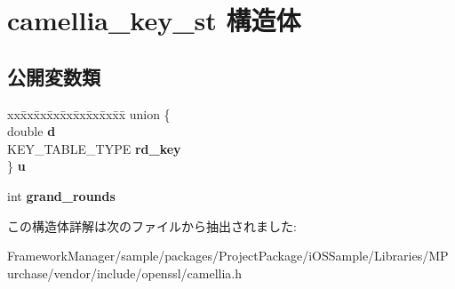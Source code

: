 \hypertarget{structcamellia__key__st}{}\section{camellia\+\_\+key\+\_\+st 構造体}
\label{structcamellia__key__st}
\subsection*{公開変数類}
\begin{DoxyCompactItemize}
\item 
\hypertarget{structcamellia__key__st_ad83acb1005aa0ea9c6f51ee7fbcdc4d9}{}\begin{tabbing}
xx\=xx\=xx\=xx\=xx\=xx\=xx\=xx\=xx\=\kill
union \{\\
\>double {\bfseries d}\\
\>KEY\_TABLE\_TYPE {\bfseries rd\_key}\\
\} {\bfseries u}\label{structcamellia__key__st_ad83acb1005aa0ea9c6f51ee7fbcdc4d9}
\\

\end{tabbing}\item 
\hypertarget{structcamellia__key__st_ae0eb815e40c45d92126984b6645a7d96}{}int {\bfseries grand\+\_\+rounds}\label{structcamellia__key__st_ae0eb815e40c45d92126984b6645a7d96}

\end{DoxyCompactItemize}


この構造体詳解は次のファイルから抽出されました\+:\begin{DoxyCompactItemize}
\item 
Framework\+Manager/sample/packages/\+Project\+Package/i\+O\+S\+Sample/\+Libraries/\+M\+Purchase/vendor/include/openssl/camellia.\+h\end{DoxyCompactItemize}
